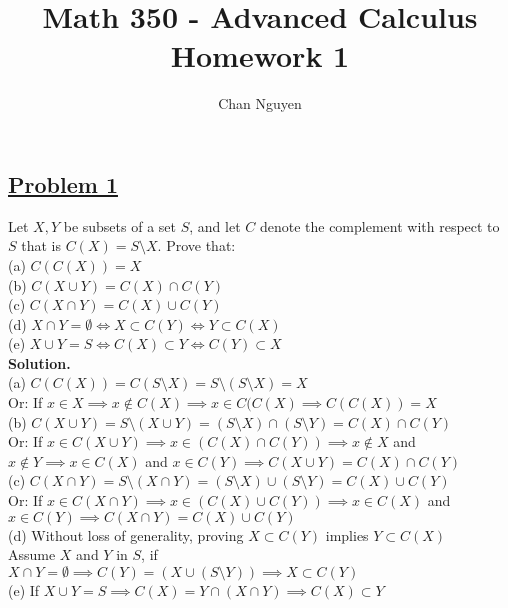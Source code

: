 \documentclass[10pt,letterpaper]{article}
\title{\textbf{Math 350 - Advanced Calculus \\ Homework 1}}
\author{Chan Nguyen}
\begin{document}
\tableofcontents 
\maketitle

\setlength{\parindent}{0pt}
\setlength{\parskip}{1ex}
	\subsection*{{\color{purple}\underline{Problem 1}}}
	Let $X, Y$ be subsets of a set $S$, and let $C$ denote the complement with respect to $S$ that is
	$C(X) = S \setminus X$. Prove that: \\
	(a) $C(C(X)) = X$ \\
	(b) $C(X \cup Y) = C(X) \cap C(Y)$ \\
	(c) $C(X \cap Y) = C(X) \cup C(Y)$ \\
	(d) $X \cap Y = \emptyset \Leftrightarrow X \subset C(Y) \Leftrightarrow Y \subset C(X)$ \\
	(e) $X \cup Y = S \Leftrightarrow C(X) \subset Y \Leftrightarrow C(Y) \subset X$ \\
	
	\textbf{Solution.} \\
	(a) $C(C(X))= C(S \setminus X) = S \setminus (S \setminus X) = X$ \\
	Or: If $x \in X \implies x \not\in C(X) \implies x \in C(C(X) \implies C(C(X)) = X$ \\
	(b) $C(X \cup Y) = S \setminus (X \cup Y) = (S \setminus X) \cap (S \setminus Y) = C(X) \cap C(Y)$ \\
	Or: If $x \in C(X \cup Y) \implies x \in (C(X) \cap C(Y)) \implies x \not\in X$ and $x \not\in Y \implies x \in C(X)$ and 
	$x \in C(Y) \implies C(X \cup Y) = C(X) \cap C(Y)$ \\
	(c) $C(X \cap Y) = S \setminus (X \cap Y) = (S \setminus X) \cup (S \setminus Y) = C(X) \cup C(Y)$ \\
	Or: If $x \in C(X \cap Y) \implies x \in (C(X) \cup C(Y)) \implies x \in C(X)$ and $x \in C(Y) \implies
	C(X \cap Y) = C(X) \cup C(Y)$ \\
	(d) Without loss of generality, proving $X \subset C(Y)$ implies $Y \subset C(X)$ \\
	Assume $X$ and $Y$ in $S$, if $X \cap Y = \emptyset \implies C(Y) = (X \cup (S \setminus Y)) 
	\implies X \subset C(Y)$ \\
	(e) If $X \cup Y = S \implies C(X) = Y \cap (X \cap Y) \implies C(X) \subset Y$\\
\end{document}
